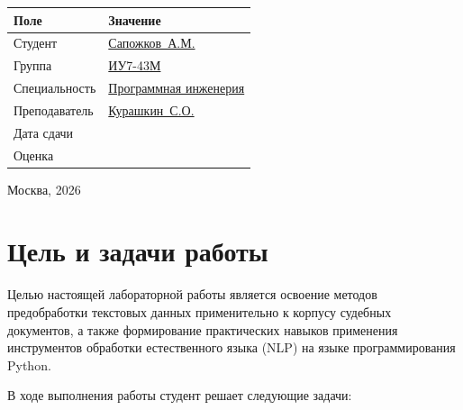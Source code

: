 \documentclass[12pt, a4paper]{report}
\begin{document}
\begin{titlepage}
\begin{flushright}
	\begin{tabular}{p{5cm}p{7cm}}
		\toprule
		\rowcolor{LightBlue}
		\sffamily\small\bfseries Поле & \sffamily\small\bfseries Значение \\
		\midrule
		\sffamily\small Студент       & \underline{Сапожков~А.М.\hspace{3.5cm}} \\[4pt]
		\sffamily\small Группа        & \underline{ИУ7-43М\hspace{4.5cm}} \\[4pt]
		\sffamily\small Специальность & \underline{Программная инженерия\hspace{1.5cm}} \\[4pt]
		\sffamily\small Преподаватель & \underline{Курашкин~С.О.\hspace{3.5cm}} \\[4pt]
		\sffamily\small Дата сдачи    & \underline{\hspace{6.5cm}} \\[4pt]
		\sffamily\small Оценка        & \underline{\hspace{6.5cm}} \\
		\bottomrule
	\end{tabular}
\end{flushright}

\vfill
\begin{center}
  {\sffamily\normalsize Москва, 2026}
\end{center}
\end{titlepage}

\tableofcontents
\thispagestyle{plain}
\clearpage

\chapter{Цель и задачи работы}

Целью настоящей лабораторной работы является освоение методов предобработки
текстовых данных применительно к корпусу судебных документов, а также формирование
практических навыков применения инструментов обработки естественного языка (NLP)
на языке программирования Python.

В ходе выполнения работы студент решает следующие задачи:
\end{document}
